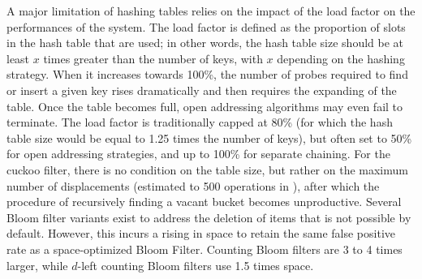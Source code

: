 \documentclass{llncs}
\newcounter{prob}
\begin{document}
A major limitation of hashing tables relies on the impact of the load factor on the performances of the system. The load factor is defined as the proportion of slots in the hash table that are used; in other words, the hash table size should be at least $x$ times greater than the number of keys, with $x$ depending on the hashing strategy. When it increases towards 100\%, the number of probes required to find or insert a given key rises dramatically and then requires the expanding of the table. Once the table becomes full, open addressing algorithms may even fail to terminate. The load factor is traditionally capped at 80\% (for which the hash table size would be equal to 1.25 times the number of keys), but often set to 50\% for open addressing strategies, and up to 100\% for separate chaining.
For the cuckoo filter, there is no condition on the table size, but rather on the maximum number of displacements (estimated to 500 operations in \cite{Fan2014}), after which the procedure of recursively finding a vacant bucket becomes unproductive. Several Bloom filter variants exist to address the deletion of items that is not possible by default. However, this incurs a rising in space to retain the same false positive rate as a space-optimized Bloom Filter. Counting Bloom filters \cite{Tarkoma2012} are 3 to 4 times larger, while $d$-left counting Bloom filters \cite{Bonomi2006} use 1.5 times space.
\end{document}
